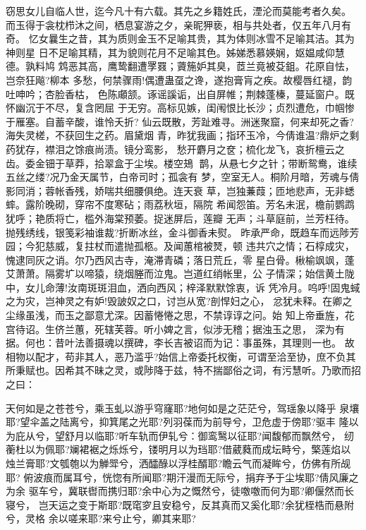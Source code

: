 窃思女儿自临人世，迄今凡十有六载。其先之乡籍姓氏，湮沦而莫能考者久矣。
而玉得于衾枕栉沐之间，栖息宴游之夕，亲昵狎亵，相与共处者，仅五年八月有奇。
忆女曩生之昔，其为质则金玉不足喻其贵，其为体则冰雪不足喻其洁。其为神则星
日不足喻其精，其为貌则花月不足喻其色。姊娣悉慕媖娴，妪媪咸仰慧德。孰料鸠
鸩恶其高，鹰鸷翻遭罦罬；薋箷妒其臭，茝兰竟被芟鉏。花原自怯，岂奈狂飚?柳本
多愁，何禁骤雨!偶遭蛊虿之谗，遂抱膏肓之疾。故樱唇红褪，韵吐呻吟；杏脸香枯，
色陈顑颔。诼谣謑诟，出自屏帷；荆棘蓬榛，蔓延窗户。既怀幽沉于不尽，复含罔屈
于无穷。高标见嫉，闺闱恨比长沙；贞烈遭危，巾帼惨于雁塞。自蓄辛酸，谁怜夭折?
仙云既散，芳趾难寻。洲迷聚窟，何来却死之香?海失灵槎，不获回生之药。眉黛烟
青，昨犹我画；指环玉冷，今倩谁温?鼎炉之剩药犹存，襟泪之馀痕尚渍。镜分鸾影，
愁开麝月之奁；梳化龙飞，哀折檀云之齿。委金钿于草莽，拾翠盒于尘埃。楼空鳷
鹊，从悬七夕之针；带断鸳鸯，谁续五丝之缕?况乃金天属节，白帝司时；孤衾有
梦，空室无人。桐阶月暗，芳魂与倩影同消；蓉帐香残，娇喘共细腰俱绝。连天衰
草，岂独蒹葭；匝地悲声，无非蟋蟀。露阶晚砌，穿帘不度寒砧；雨荔秋垣，隔院
希闻怨笛。芳名未泯，檐前鹦鹉犹呼；艳质将亡，槛外海棠预萎。捉迷屏后，莲瓣
无声；斗草庭前，兰芳枉待。抛残绣线，银笺彩袖谁裁?折断冰丝，金斗御香未熨。
昨承严命，既趋车而远陟芳园；今犯慈威，复拄杖而遣抛孤柩。及闻蕙棺被燹，顿
违共穴之情；石椁成灾，愧逮同灰之诮。尔乃西风古寺，淹滞青磷；落日荒丘，零
星白骨。楸榆飒飒，蓬艾萧萧。隔雾圹以啼猿，绕烟塍而泣鬼。岂道红绡帐里，公
子情深；始信黄土陇中，女儿命薄!汝南斑斑泪血，洒向西风；梓泽默默馀衷，诉
凭冷月。呜呼!固鬼蜮之为灾，岂神灵之有妒!毁詖奴之口，讨岂从宽?剖悍妇之心，
忿犹未释。在卿之尘缘虽浅，而玉之鄙意尤深。因蓄惓惓之思，不禁谆谆之问。始
知上帝垂旌，花宫待诏。生侪兰蕙，死辖芙蓉。听小婢之言，似涉无稽；据浊玉之思，
深为有据。何也：昔叶法善摄魂以撰碑，李长吉被诏而为记：事虽殊，其理则一也。
故相物以配才，苟非其人，恶乃滥乎?始信上帝委托权衡，可谓至洽至协，庶不负其
所秉赋也。因希其不昧之灵，或陟降于兹，特不揣鄙俗之词，有污慧听。乃歌而招
之曰：

天何如是之苍苍兮，乘玉虬以游乎穹窿耶?地何如是之茫茫兮，驾瑶象以降乎
泉壤耶?望伞盖之陆离兮，抑箕尾之光耶?列羽葆而为前导兮，卫危虚于傍耶?驱丰
隆以为庇从兮，望舒月以临耶?听车轨而伊轧兮：御鸾鹥以征耶?闻馥郁而飘然兮，
纫蘅杜以为佩耶?斓裙裾之烁烁兮，镂明月以为珰耶?借葳蕤而成坛畤兮，檠莲焰以
烛兰膏耶?文瓠匏以为觯斝兮，洒醽醁以浮桂醑耶?瞻云气而凝眸兮，仿佛有所觇耶?
俯波痕而属耳兮，恍惚有所闻耶?期汗漫而无际兮，捐弃予于尘埃耶?倩风廉之为余
驱车兮，冀联辔而携归耶?余中心为之慨然兮，徒噭噭而何为耶?卿偃然而长寝兮，
岂天运之变于斯耶?既窀穸且安稳兮，反其真而又奚化耶?余犹桎梏而悬附兮，灵格
余以嗟来耶?来兮止兮，卿其来耶?

